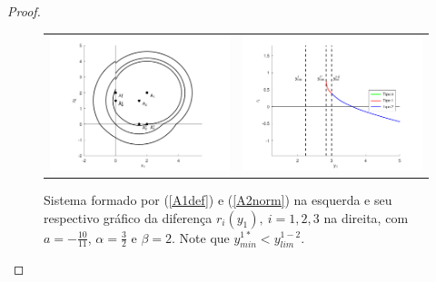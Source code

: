 \begin{proof}
\begin{figure}[H]
\centering
\begin{table}[H]
\centering
\begin{tabular}{cc}
\includegraphics[width=7cm]{images/1.1x1_yeqx_zaft.png}
&
\includegraphics[width=7cm]{images/1.1x1_yeqx_zaft_diff.png}
\end{tabular}
\end{table}
\caption{\centering\label{prepc}Sistema formado por (\ref{A1def}) e (\ref{A2norm}) na esquerda e seu respectivo gráfico da diferença $r_i(y_1),\  i=1,2,3$ na direita, com $a=-\frac{10}{11}$, $\alpha=\frac{3}{2}$ e $\beta=2$. Note que $y_{min}^{1*}< y_{lim}^{1-2}$.}
\end{figure}


\end{proof}
